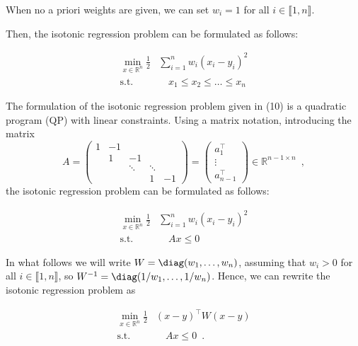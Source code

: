 \documentclass[12pt,preprint]{elsarticle}
\begin{document}
When no a priori weights are given, we can set $w_i = 1$ for all $i \in \llbracket 1, n \rrbracket$.

Then, the isotonic regression problem can be formulated as follows:

\begin{align}
\min_{x \in \mathbb{R}^n}
\frac{1}{2}
& \sum_{i=1}^{n} w_i (x_i - y_i)^2 \\
\text{s.t.} & \quad x_1 \leq x_2 \leq \ldots \leq x_n \nonumber
\end{align}

The formulation of the isotonic regression problem given in (10) is a quadratic program (QP) with linear constraints.
Using a matrix notation, introducing the matrix
$$A = \begin{pmatrix} 1 & -1 &                       &                       &    \\
  & 1  & -1                    &                       &    \\
  &    & \ddots & \ddots &    \\
  &    &                       & 1                     & -1\end{pmatrix}
 =
\begin{pmatrix}
a_1^\top \\
\vdots   \\
a_{n-1}^\top
\end{pmatrix}
 \in \mathbb{R}^{n-1 \times n}\enspace,
$$
the isotonic regression problem can be formulated as follows:

\begin{align}
\min_{x \in \mathbb{R}^n}
\frac{1}{2}
& \sum_{i=1}^{n} w_i (x_i - y_i)^2 \\
\text{s.t.} & \quad Ax \leq 0 \nonumber
\end{align}




In what follows we will write $W=\diag(w_1,\dots,w_n)$, assuming that $w_i > 0$ for all $i \in \llbracket 1, n \rrbracket$, so $W^{-1}= \diag(1/w_1,\dots,1/w_n)$.
Hence, we can rewrite the isotonic regression problem as


\begin{align}
\min_{x \in \mathbb{R}^n}
\frac{1}{2}
& (x-y)^\top W (x-y) \\
\text{s.t.} & \quad Ax \leq 0 \enspace.
\end{align}
\end{document}
